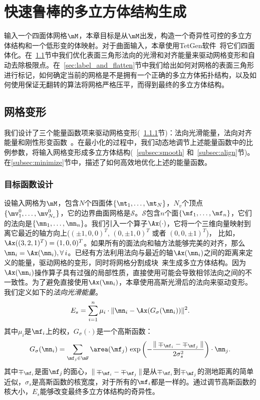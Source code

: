 ﻿\chapter{快速鲁棒的多立方体结构生成} \label{chap:polycube}
输入一个四面体网格$\mM$，本章目标是从$\mM$出发，构造一个奇异性可控的多立方体结构和一个低形变的体映射。对于曲面输入，本章使用TetGen软件~\cite{Si2015}将它们四面体化。在~\ref{sec:deform}节中我们优化表面三角形法向的光滑和对齐能量来驱动网格变形和自动去除极限点。在~\ref{sec:label_and_flatten}节中我们给出如何对网格的表面三角形进行标记，如何确定当前的网格是不是拥有一个正确的多立方体拓扑结构，以及如何使用保证无翻转的算法将网格严格压平，而得到最终的多立方体结构。

\section{网格变形} \label{sec:deform}
我们设计了三个能量函数项来驱动网格变形(~\ref{sec:obj}节)：法向光滑能量，法向对齐能量和刚性形变函数~\cite{Fu2015}。在最小化的过程中，我们动态地调节上述能量函数中的比例参数，将输入网格变形成多立方体结构(~\ref{subsec:smooth} 和~\ref{subsec:align}节)。在\ref{subsec:minimize}节中，描述了如何高效地优化上述的能量函数。

\subsection{目标函数设计} \label{sec:obj}
设输入网格为$\mM$，包含$N$个四面体$\{\mt_1,\ldots,\mt_N\}$，$N_v$个顶点$\{\mv^0_1,\ldots,\mv^0_{N_v}\}$，它的边界曲面网格是$\mathcal{S}$。$\mathcal{S}$包含$n$个面$\{\mf_1,\ldots,\mf_n\}$，它们的法向是$\{\mn_1,\ldots,\mn_n\}$。我们引入一个算子$\Ax(\cdot)$，它将一个三维向量映射到离它最近的轴方向上($(\pm 1,0,0)^T$, $(0,\pm 1,0)^T$ 或者 $(0,0,\pm 1)^T$)， 比如，$\Ax ((3,2,1)^T) = (1,0,0)^T$。如果所有的面法向和轴方法能够完美的对齐，那么$\mn_i = \Ax (\mn_i), \forall \, i$。已经有方法利用法向与最近的轴$\Ax(\mn_i)$之间的距离来定义的能量，驱动网格的变形，同时将网格分割成块~\cite{Gregson2011}来生成多立方体结构。因为$\Ax(\mn_i)$操作算子具有过强的局部性质，直接使用可能会导致相邻法向之间的不一致性。为了避免直接使用$\Ax(\mn_i)$，本章使用高斯光滑后的法向来驱动变形。我们定义如下的\emph{法向光滑能量}。
\begin{equation} \label{eqn:smooth}
E_s = \sum_{i=1}^n \mu_i \cdot \| \mn_i - \Ax(G_\sigma(\mn_i)) \|^2.
\end{equation}
其中$\mu_i$是$\mf_i$上的权，$G_\sigma (\cdot)$是一个高斯函数：
\begin{equation}
G_\sigma (\mn_i) = \sum_{\mf_j \in \mF} \area(\mf_j)\,\exp\left(-\dfrac{\|\mp_{\mf_i}-\mp_{\mf_j}\|}{2\sigma_s^2} \right) \cdot \mn_j.
\end{equation}
其中$\mp_{\mf_i}$是面$\mf_j$的面心，$\|\mp_{\mf_i}-\mp_{\mf_j}\|$是从$\mp_{\mf_i}$到$\mp_{\mf_j}$的测地距离的简单近似，$\sigma_s$是高斯函数的核宽度，对于所有的$\mf_i$都是一样的。通过调节高斯函数的核大小，$E_s$能够改变最终多立方体结构的奇异性。

